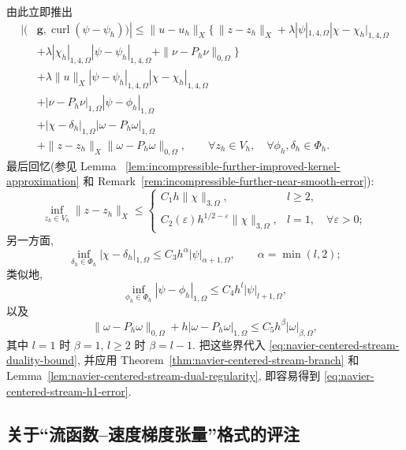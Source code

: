 \begin{Proof}
由此立即推出
\begin{equation}\label{eq:navier-centered-stream-duality-bound}
\begin{aligned}
|(&\boldsymbol g,\operatorname{curl}(\psi-\psi_h))|
\leq\|u-u_h\|_X
\{\,\|z-z_h\|_X
+\lambda|\psi|_{1,4,\Omega}|\chi-\chi_h|_{1,4,\Omega}\\
&+\lambda|\chi_h|_{1,4,\Omega}|\psi-\psi_h|_{1,4,\Omega}
+\|\nu-P_h\nu\|_{0,\Omega}\}\\
&+\lambda\|u\|_X|\psi-\psi_h|_{1,4,\Omega}
|\chi-\chi_h|_{1,4,\Omega}\\
&+|\nu-P_h\nu|_{1,\Omega}|\psi-\phi_h|_{1,\Omega}\\
&+|\chi-\delta_h|_{1,\Omega}|\omega-P_h\omega|_{1,\Omega}\\
&+\|z-z_h\|_X\|\omega-P_h\omega\|_{0,\Omega},
\qquad
\forall z_h\in V_h,
\quad\forall\phi_h,\delta_h\in\Phi_h.
\end{aligned}
\end{equation}
最后回忆(参见 Lemma~
\ref{lem:incompressible-further-improved-kernel-approximation} 和
Remark~\ref{rem:incompressible-further-near-smooth-error}):
\[
\inf_{z_h\in V_h}\|z-z_h\|_X
\leq
\begin{cases}
C_1h\|\chi\|_{3,\Omega},&l\geq2,\\
C_2(\varepsilon)h^{1/2-\varepsilon}\|\chi\|_{3,\Omega},
&l=1,\quad\forall\varepsilon>0;
\end{cases}
\]
另一方面,
\[
\inf_{\delta_h\in\Phi_h}|\chi-\delta_h|_{1,\Omega}
\leq C_3h^\alpha|\psi|_{\alpha+1,\Omega},
\qquad
\alpha=\min(l,2);
\]
类似地,
\[
\inf_{\phi_h\in\Phi_h}|\psi-\phi_h|_{1,\Omega}
\leq C_4h^l|\psi|_{l+1,\Omega},
\]
以及
\[
\|\omega-P_h\omega\|_{0,\Omega}
+h|\omega-P_h\omega|_{1,\Omega}
\leq C_5h^\beta|\omega|_{\beta,\Omega},
\]
其中 $l=1$ 时 $\beta=1$, $l\geq2$ 时 $\beta=l-1$.
把这些界代入 \eqref{eq:navier-centered-stream-duality-bound},
并应用 Theorem~\ref{thm:navier-centered-stream-branch} 和
Lemma~\ref{lem:navier-centered-stream-dual-regularity}, 即容易得到
\eqref{eq:navier-centered-stream-h1-error}.
\end{Proof}

\subsection{关于``流函数--速度梯度张量''格式的评注}
\label{subsec:navier-centered-stream-gradient-tensor}

